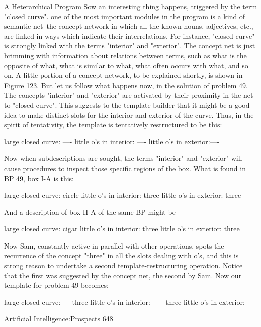                                  A Heterarchical Program
   Sow an interesting thing happens, triggered by the term "closed curve". one of the
   most important modules in the program is a kind of semantic net--the concept
   network-in which all the known nouns, adjectives, etc., are linked in ways which
   indicate their interrelations. For instance, "closed curve" is strongly linked with
   the terms "interior" and "exterior". The concept net is just brimming with
   information about relations between terms, such as what is the opposite of what,
   what is similar to what, what often occurs with what, and so on. A little portion of
   a concept network, to be explained shortly, is shown in Figure 123. But let us
   follow what happens now, in the solution of problem 49. The concepts "interior"
   and "exterior" are activated by their proximity in the net to "closed curve". This
   suggests to the template-builder that it might be a good idea to make distinct slots
   for the interior and exterior of the curve. Thus, in the spirit of tentativity, the
   template is tentatively restructured to be this:

       large closed curve: ----
       little o's in interior: ----
       little o's in exterior:----

   Now when subdescriptions are sought, the terms "interior" and "exterior" will
   cause procedures to inspect those specific regions of the box. What is found in BP
   49, box I-A is this:

       large closed curve: circle
       little o's in interior: three
       little o's in exterior: three

   And a description of box II-A of the same BP might be

       large closed curve: cigar
       little o's in interior: three
       little o's in exterior: three

       Now Sam, constantly active in parallel with other operations, spots the
   recurrence of the concept "three" in all the slots dealing with o's, and this is strong
   reason to undertake a second template-restructuring operation. Notice that the first
   was suggested by the concept net, the second by Sam. Now our template for
   problem 49 becomes:

       large closed curve:----
       three little o's in interior: -----
       three little o's in exterior:-----


Artificial Intelligence:Prospects                                                        648

